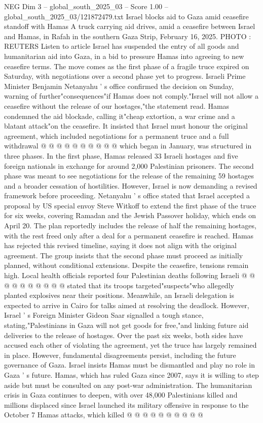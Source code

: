 \begin{textsample}{NEG Dim 3 – global\_south\_2025\_03 – Score 1.00 – global\_south\_2025\_03/121872479.txt}  \label{ex:f3_neg_423}
Israel blocks aid to Gaza amid ceasefire standoff with Hamas A truck carrying aid drives, amid a ceasefire between Israel and Hamas, in Rafah in the southern Gaza Strip, February 16, 2025.
PHOTO : REUTERS Listen to article Israel has suspended the entry of all goods and humanitarian aid into Gaza, in a bid to pressure Hamas into agreeing to new ceasefire terms.
The move comes as the first phase of a fragile truce expired on Saturday, with negotiations over a second phase yet to progress.
Israeli Prime Minister Benjamin Netanyahu ' s office confirmed the decision on Sunday, warning of further"consequences"if Hamas does not comply."Israel will not allow a ceasefire without the release of our hostages,"the statement read.
Hamas condemned the aid blockade, calling it"cheap extortion, a war crime and a blatant attack"on the ceasefire.
It insisted that Israel must honour the original agreement, which included negotiations for a permanent truce and a full withdrawal @ @ @ @ @ @ @ @ @ @ which began in January, was structured in three phases.
In the first phase, Hamas released 33 Israeli hostages and five foreign nationals in exchange for around 2,000 Palestinian prisoners.
The second phase was meant to see negotiations for the release of the remaining 59 hostages and a broader cessation of hostilities.
However, Israel is now demanding a revised framework before proceeding.
Netanyahu ' s office stated that Israel accepted a proposal by US special envoy Steve Witkoff to extend the first phase of the truce for six weeks, covering Ramadan and the Jewish Passover holiday, which ends on April 20.
The plan reportedly includes the release of half the remaining hostages, with the rest freed only after a deal for a permanent ceasefire is reached.
Hamas has rejected this revised timeline, saying it does not align with the original agreement.
The group insists that the second phase must proceed as initially planned, without conditional extensions.
Despite the ceasefire, tensions remain high.
Local health officials reported four Palestinian deaths following Israeli @ @ @ @ @ @ @ @ @ @ stated that its troops targeted"suspects"who allegedly planted explosives near their positions.
Meanwhile, an Israeli delegation is expected to arrive in Cairo for talks aimed at resolving the deadlock.
However, Israel ' s Foreign Minister Gideon Saar signalled a tough stance, stating,"Palestinians in Gaza will not get goods for free,"and linking future aid deliveries to the release of hostages.
Over the past six weeks, both sides have accused each other of violating the agreement, yet the truce has largely remained in place.
However, fundamental disagreements persist, including the future governance of Gaza.
Israel insists Hamas must be dismantled and play no role in Gaza ' s future.
Hamas, which has ruled Gaza since 2007, says it is willing to step aside but must be consulted on any post-war administration.
The humanitarian crisis in Gaza continues to deepen, with over 48,000 Palestinians killed and millions displaced since Israel launched its military offensive in response to the October 7 Hamas attacks, which killed @ @ @ @ @ @ @ @ @ @

\end{textsample}
